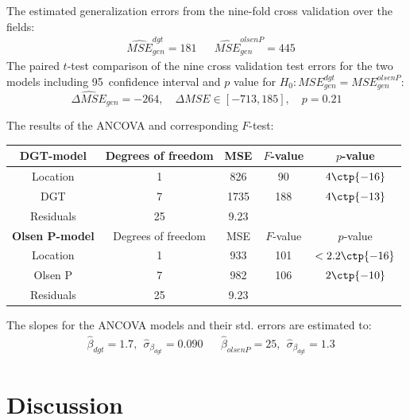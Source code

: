 \documentclass[11pt,fleqn]{article}
\begin{document}
The estimated generalization errors from the nine-fold cross validation over the fields:
\begin{align*}
	& \widehat {MSE}_{gen} ^{dgt} = 181
	&& \widehat {MSE}_{gen} ^{olsenP} = 445
\end{align*}
The paired \(t\)-test comparison of the nine cross validation test errors for the two models including 95\pro\ confidence interval and \(p\) value for \(H_0: {MSE}_{gen} ^{dgt}={MSE}_{gen} ^{olsenP}\):
\[
\widehat{\Delta MSE}_{gen} = -264, \quad \Delta MSE\in [-713, 185],\quad  p=0.21
\]



\noindent
The results of the ANCOVA and corresponding \(F\)-test:  
\begin{table}[H]
	\centering
	\begin{tabular}{c | c c c c}
	\textbf{DGT-model}  &Degrees of freedom & MSE&\(F\)-value&\(p\)-value\\
	\hline 
	Location  & 1& 826 & 90 & \(4\ctp{-16}\)\\
	DGT  & 7&1735 &  188 & \(4\ctp{-13}\)\\
	Residuals &25 &9.23 &\\
	\hline 
	\textbf{Olsen P-model} &Degrees of freedom & MSE&\(F\)-value&\(p\)-value\\
	\hline 
	Location & 1&933 & 101 & \(<2.2\ctp{-16}\)\\
	Olsen P &7 &982 & 106 & \(2 \ctp{-10}\)\\
	Residuals &25  &9.23
	\end{tabular}
\end{table}\noindent 
The slopes for the ANCOVA models and their std. errors are estimated to:
\begin{align*}
	&\hat \beta_{dgt}= 1.7,\ \ \hat \sigma_{\beta_{dgt}}=0.090
	&&\hat \beta_{olsenP}= 25,\ \ \hat \sigma_{\beta_{dgt}}=1.3
\end{align*}
\section{Discussion}
\end{document}
